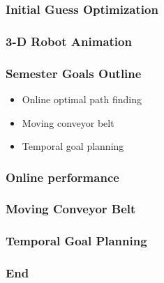 \documentclass{beamer}
\begin{document}
\begin{frame}
\frametitle{Initial Guess Optimization}

\end{frame}


\begin{frame}
\frametitle{3-D Robot Animation}

\end{frame}


\begin{frame}
\frametitle{Semester Goals Outline}
\begin{itemize}
\item Online optimal path finding
\item Moving conveyor belt
\item Temporal goal planning
\end{itemize}

\end{frame}


\begin{frame}
\frametitle{Online performance}

\end{frame}


\begin{frame}
\frametitle{Moving Conveyor Belt}

\end{frame}


\begin{frame}
\frametitle{Temporal Goal Planning}

\end{frame}

\begin{frame}
\frametitle{End}

\end{frame}
\end{document}
